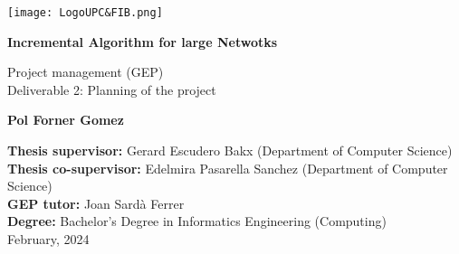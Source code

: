 \begin{titlepage}
    \centering

    \vspace*{1cm}
    \texttt{[image: LogoUPC\&FIB.png]}

    \vspace*{2cm}
    {\huge \textbf{Incremental Algorithm for large Netwotks}}

    \vspace*{.5cm}
    {\LARGE Project management (GEP)} \\
    {\LARGE Deliverable 2: Planning of the project}


    \vspace{2cm}

    \LARGE

    \begin{minipage}{.5\textwidth}
        \centering
        \textbf{Pol Forner Gomez}
    \end{minipage}

    \large

    \vfill

    \textbf{Thesis supervisor:}  Gerard Escudero Bakx (Department of Computer Science) \\
    \textbf{Thesis co-supervisor:}  Edelmira Pasarella Sanchez (Department of Computer Science) \\
    \textbf{GEP tutor:}  Joan Sardà Ferrer \\
    \textbf{Degree:}  Bachelor's Degree in Informatics Engineering (Computing) \\

    February, 2024
\end{titlepage}